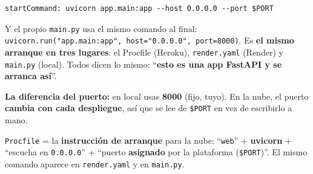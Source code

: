\documentclass[11pt,a4paper]{article}
\begin{document}
\begin{lstlisting}
startCommand: uvicorn app.main:app --host 0.0.0.0 --port $PORT
\end{lstlisting}

Y el propio \texttt{main.py} usa el mismo comando al final:
\texttt{uvicorn.run("app.main:app", host="0.0.0.0", port=8000)}. Es \textbf{el mismo arranque en
tres lugares}: el Procfile (Heroku), \texttt{render.yaml} (Render) y \texttt{main.py} (local).
Todos dicen lo mismo: ``\textbf{esto es una app FastAPI y se arranca así}''.

\textbf{La diferencia del puerto:} en local usas \textbf{8000} (fijo, tuyo). En la nube, el
puerto \textbf{cambia con cada despliegue}, así que se lee de \texttt{\$PORT} en vez de
escribirlo a mano.

\begin{recuadro}
\texttt{Procfile} = la \textbf{instrucción de arranque} para la nube: ``\texttt{web}'' +
\textbf{uvicorn} + ``escucha en \texttt{0.0.0.0}'' + ``puerto \textbf{asignado} por la plataforma
(\texttt{\$PORT})''. El mismo comando aparece en \texttt{render.yaml} y en \texttt{main.py}.
\end{recuadro}
\end{document}
